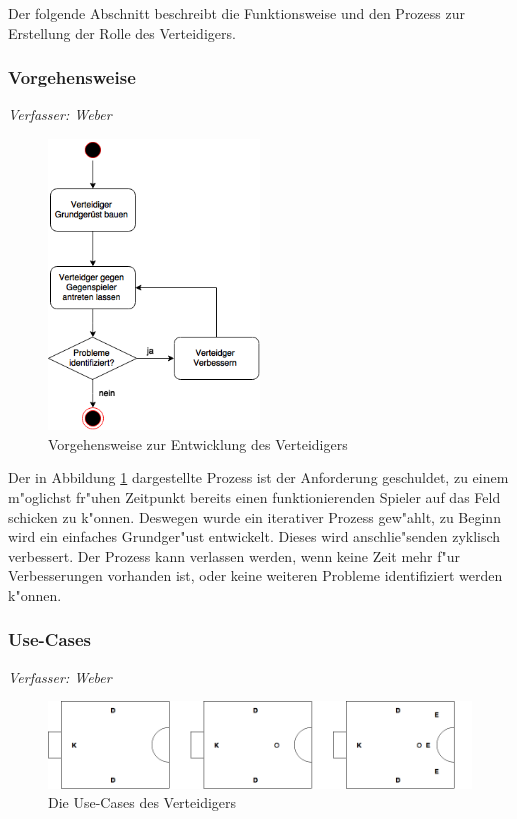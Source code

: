 Der folgende Abschnitt beschreibt die Funktionsweise und den Prozess zur Erstellung der Rolle des Verteidigers.

\subsubsection{Vorgehensweise}
\textit{Verfasser: Weber}\\

\begin{figure}[H]
	\centering
	\includegraphics[width=0.5\textwidth]{Grafiken/KI/defender/vorgehensweise.png}
	\caption{Vorgehensweise zur Entwicklung des Verteidigers}
	\label{Vorgehensweise-Verteidigers}
\end{figure}
Der in Abbildung \ref{Vorgehensweise-Verteidigers} dargestellte Prozess ist der Anforderung geschuldet, zu einem m"oglichst fr"uhen Zeitpunkt bereits einen funktionierenden Spieler auf das Feld schicken zu k"onnen. Deswegen wurde ein iterativer Prozess gew"ahlt, zu Beginn wird ein einfaches Grundger"ust entwickelt. Dieses wird anschlie"senden zyklisch verbessert. Der Prozess kann verlassen werden, wenn keine Zeit mehr f"ur Verbesserungen vorhanden ist, oder keine weiteren Probleme identifiziert werden k"onnen.

\subsubsection{Use-Cases}
\textit{Verfasser: Weber}\\

\begin{figure}[H]
	\centering
	\includegraphics[width=\ScaleIfNeeded]{Grafiken/KI/defender/useCases.png}
	\caption{Die Use-Cases des Verteidigers}
	\label{Usecases-Verteidigers}
\end{figure}


